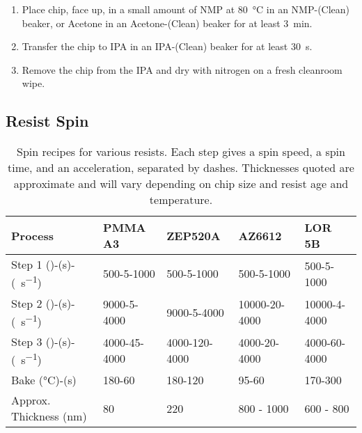 
\begin{enumerate}
    \item Place chip, face up, in a small amount of NMP at \SI{80}{\celsius} in an NMP-(Clean) beaker, or Acetone in an Acetone-(Clean) beaker for at least \SI{3}{\minute}.
    \item Transfer the chip to IPA in an IPA-(Clean) beaker for at least \SI{30}{\second}.
    \item Remove the chip from the IPA and dry with nitrogen on a fresh cleanroom wipe.
\end{enumerate}

\newcommand{\spinunits}{(\si{\rpm})-(\si{\second})-(\si{\rpm\per\second})}
\subsection{Resist Spin}
\label{sec:spin}

\begin{table}
    \centering
    \hspace*{-1cm}
    \begin{tabular}{|l|l|l|l|l|}
        \hline
        Process                                  & PMMA A3     & ZEP520A       & AZ6612       & LOR 5B\\
        \hline \hline
        Step 1 \spinunits                        & 500-5-1000   & 500-5-1000   & 500-5-1000   & 500-5-1000   \\ \hline
        Step 2 \spinunits                        & 9000-5-4000  & 9000-5-4000  & 10000-20-4000& 10000-4-4000 \\ \hline
        Step 3 \spinunits                        & 4000-45-4000 & 4000-120-4000& 4000-20-4000 & 4000-60-4000 \\ \hline
        Bake (\si{\celsius})-(\si{\second})      & 180-60       & 180-120      & 95-60        & 170-300      \\ \hline
        Approx. Thickness (\si{\nano\meter})     & 80           & 220          & 800 - 1000   & 600 - 800    \\
        \hline
    \end{tabular}
    \hspace*{-1cm}
    \caption[Spin recipes for various resists]
    {Spin recipes for various resists. Each step gives a spin speed, a spin time, and an acceleration, separated by dashes.
    Thicknesses quoted are approximate and will vary depending on chip size and resist age and temperature.}
    \label{tab:spin}
\end{table}

